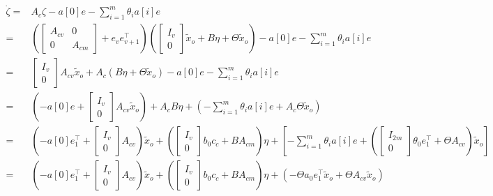 \documentclass[a4paper,12pt]{article}
\begin{document}
\begin{align*}
    \dot{\zeta} 
        = & A_c\zeta - a[0] e - \sum_{i=1}^m \theta_i a[i]e
    \\ = & 
    \left(\begin{bmatrix}
        A_{cv} & 0 \\
        0 & A_{cm}
    \end{bmatrix}
    + e_ve_{v+1}^\top\right)
    \left(\begin{bmatrix}I_{v} \\ 0 \end{bmatrix} \tilde{x}_o + B\eta + \Theta \tilde{x}_o\right) 
    - a[0] e - \sum_{i=1}^m \theta_i a[i]e
    \\ = &
    \begin{bmatrix}I_{v} \\ 0 \end{bmatrix} A_{cv}\tilde{x}_o
     + A_c \left(B\eta + \Theta \tilde{x}_o\right) 
     - a[0] e - \sum_{i=1}^m \theta_i a[i]e
    \\ = &
    \left( - a[0] e + \begin{bmatrix}I_{v} \\ 0 \end{bmatrix} A_{cv}\tilde{x}_o\right)
    + A_cB\eta 
    + \left(- \sum_{i=1}^m \theta_i a[i]e + A_c \Theta {\tilde{x}}_o \right)
    \\ = &
    \left( -a[0]e_1^\top + \begin{bmatrix}I_{v} \\ 0 \end{bmatrix}A_{cv} \right)\tilde{x}_o
    + \left( \begin{bmatrix}I_{v} \\ 0 \end{bmatrix} b_0c_c + BA_{cm}\right)\eta 
    + \left[- \sum_{i=1}^m \theta_i a[i]e
    + \left(\begin{bmatrix}I_{2m} \\ 0 \end{bmatrix}\theta_0e_1^\top + \Theta A_{cv}\right)
    {\tilde{x}}_o \right]
    \\ = &
    \left( -a[0]e_1^\top + \begin{bmatrix}I_{v} \\ 0 \end{bmatrix}A_{cv} \right)\tilde{x}_o
    + \left( \begin{bmatrix}I_{v} \\ 0 \end{bmatrix} b_0c_c + BA_{cm}\right)\eta 
    + \left(- \Theta a_0 e_1^\top\tilde{x}_o 
    + \Theta A_{cv}{\tilde{x}}_o \right)
\end{align*}
\end{document}

